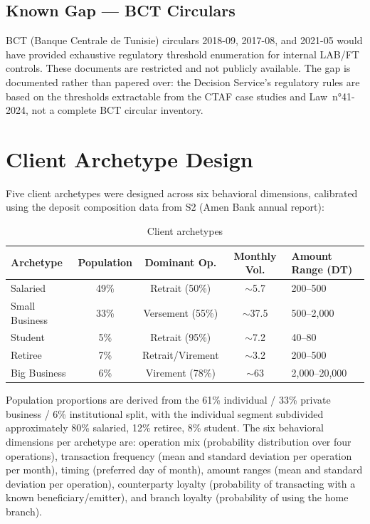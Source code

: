 \subsection{Known Gap --- BCT Circulars}

BCT (Banque Centrale de Tunisie) circulars 2018-09, 2017-08, and 2021-05 would
have provided exhaustive regulatory threshold enumeration for internal LAB/FT
controls. These documents are restricted and not publicly available. The gap is
documented rather than papered over: the Decision Service's regulatory rules are
based on the thresholds extractable from the CTAF case studies and Law~n°41-2024,
not a complete BCT circular inventory.

\section{Client Archetype Design}

Five client archetypes were designed across six behavioral dimensions, calibrated
using the deposit composition data from S2 (Amen Bank annual report):

\begin{table}[H]
\centering
\caption{Client archetypes}
\label{tab:archetypes}
\begin{tabular}{@{}lcccl@{}}
\toprule
\textbf{Archetype} & \textbf{Population} & \textbf{Dominant Op.} &
\textbf{Monthly Vol.} & \textbf{Amount Range (DT)} \\
\midrule
Salaried      & 49\% & Retrait (50\%)    & $\sim$5.7  & 200--500 \\
Small Business & 33\% & Versement (55\%)  & $\sim$37.5 & 500--2,000 \\
Student       & 5\%  & Retrait (95\%)    & $\sim$7.2  & 40--80 \\
Retiree       & 7\%  & Retrait/Virement  & $\sim$3.2  & 200--500 \\
Big Business  & 6\%  & Virement (78\%)   & $\sim$63   & 2,000--20,000 \\
\bottomrule
\end{tabular}
\end{table}

Population proportions are derived from the 61\% individual / 33\% private
business / 6\% institutional split, with the individual segment subdivided
approximately 80\% salaried, 12\% retiree, 8\% student. The six behavioral
dimensions per archetype are: operation mix (probability distribution over
four operations), transaction frequency (mean and standard deviation per
operation per month), timing (preferred day of month), amount ranges (mean
and standard deviation per operation), counterparty loyalty (probability
of transacting with a known beneficiary/emitter), and branch loyalty
(probability of using the home branch).

